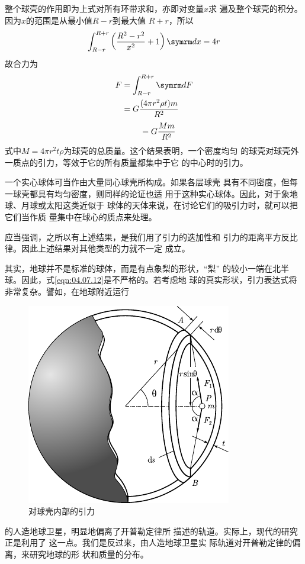 整个球壳的作用即为上式对所有环带求和，亦即对变量$ x $求
遍及整个球壳的积分。因为$ x $的范围是从最小值$ R - r $到最大值
$ R + r $，所以
\begin{equation}\label{eqn:04.07.11}
 \int _ { R - r } ^ { R + r } \left( \frac { R ^ { 2 } - r ^ { 2 } } { x ^ { 2 } } + 1 \right) \dif x = 4 r
\end{equation}
故合力为
\begin{equation*}
 \begin{aligned}
 F &= \int _ { R - r } ^ { R + r } \dif F \\
&= G \frac { ( 4 \pi r ^ { 2 } \rho t ) m } { R ^ { 2 } } \\
 \end{aligned}
\end{equation*}
\begin{equation}\label{eqn:04.07.12}
    \mbox \quad = G \frac { M m } { R ^ { 2 } }
\end{equation}
式中$ M = 4 \pi r ^ { 2 } t \rho $为球壳的总质量。这个结果表明，一个密度均匀
的球壳对球壳外一质点的引力，等效于它的所有质量都集中于它
的中心时的引力。

一个实心球体可当作由大量同心球壳所构成。如果各层球壳
具有不同密度，但每一球壳都具有均匀密度，则同样的论证也适
用于这种实心球体。因此，对于象地球、月球或太阳这类近似于
球体的天体来说，在讨论它们的吸引力时，就可以把它们当作质
量集中在球心的质点来处理。

应当强调，之所以有上述结果，是我们用了引力的迭加性和
引力的距离平方反比律。因此上述结果对其他类型的力就不一定
成立。

其实，地球并不是标准的球体，而是有点象梨的形状，“梨”
的较小一端在北半球。因此，式\eqref{eqn:04.07.12}是不严格的。若考虑地
球的真实形状，引力表达式将非常复杂。譬如，在地球附近运行
\begin{figure}
    \vspace{-0.5em}
 \centering
 \includegraphics{figure/fig04.11}
 \caption{对球壳内部的引力}
 \label{fig:04.11}
\end{figure}
的人造地球卫星，明显地偏离了开普勒定律所
描述的轨道。实际上，现代的研究正是利用了
这一点。我们是反过来，由人造地球卫星实
际轨道对开普勒定律的偏离，来研究地球的形
状和质量的分布。

